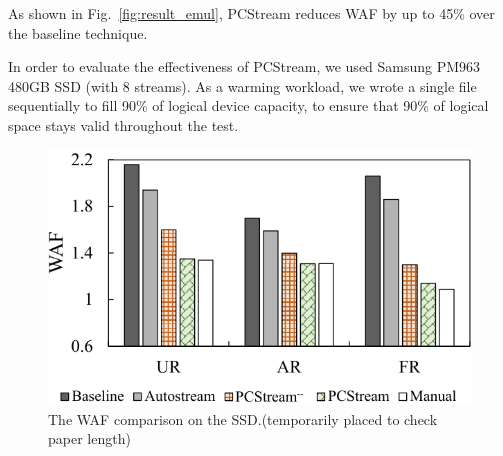As shown in Fig.~\ref{fig:result_emul}, 
{\sf PCStream} reduces WAF by up to 45\% over the baseline technique. 

In order to evaluate the effectiveness of {\sf PCStream},
we used Samsung PM963 480GB SSD (with 8 streams).
As a warming workload, we wrote a single file sequentially to fill 90\%
of logical device capacity, to ensure that 90\% of logical space stays valid
throughout the test.

\begin{figure}[t]
	\centering
	\includegraphics[width=0.8\linewidth]{figure/result_emul}
	\vspace{-10pt}
	\caption{The WAF comparison on the SSD.(temporarily placed to check paper length)}
	\label{fig:result_SSD}
	\vspace{-15pt}
\end{figure}



